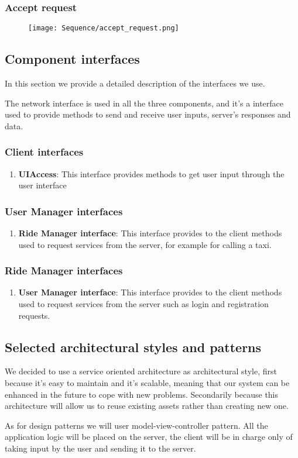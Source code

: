 	\subsubsection{Accept request}
	\begin{figure}[h!]
		\centering
		\texttt{[image: Sequence/accept\_request.png]}
	\end{figure}
	\newpage		


\subsection{Component interfaces}
In this section we provide a detailed description of the interfaces we use.

The network interface is used in all the three components, and it's a interface used to provide methods to send and receive user inputs, server's responses and data.
\subsubsection{Client interfaces}
\begin{enumerate}
	\item \textbf{UIAccess}: This interface provides methods to get user input through the user interface
\end{enumerate}
\subsubsection{User Manager interfaces}
\begin{enumerate}
	\item \textbf{Ride Manager interface}: This interface provides to the client methods used to request services from the server, for example for calling a taxi.
\end{enumerate}
\subsubsection{Ride Manager interfaces}
	\begin{enumerate}
		\item \textbf{User Manager interface}: This interface provides to the client methods used to request services from the server such as login and registration requests.
	\end{enumerate}
	
\subsection{Selected architectural styles and patterns}
We decided to use a service oriented architecture as architectural style, first because it's easy to maintain and it's scalable, meaning that our system can be enhanced in the future to cope with new problems.
Secondarily because this architecture will allow us to reuse existing assets rather than creating new one.

As for design patterns we will user model-view-controller pattern. All the application logic will be placed on the server, the client will be in charge only of taking input by the user and sending it to the server.
